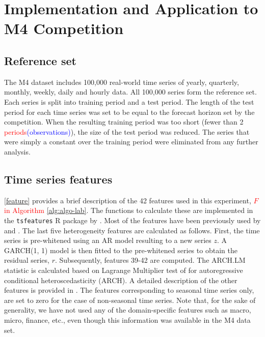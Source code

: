\documentclass[11pt,a4paper,]{article}
\theoremstyle{definition}
\theoremstyle{definition}
\theoremstyle{definition}
\theoremstyle{remark}
\begin{document}
\clearpage

\section{Implementation and Application to M4
Competition}\label{M4application}

\subsection{Reference set}\label{reference-set}

The M4 dataset includes 100,000 real-world time series of yearly,
quarterly, monthly, weekly, daily and hourly data. All 100,000 series
form the reference set. Each series is split into training period and a
test period. The length of the test period for each time series was set
to be equal to the forecast horizon set by the competition. When the
resulting training period was too short (fewer than 2
\textcolor{red}{periods}\textcolor{blue}{(observations)}), the size of
the test period was reduced. The series that were simply a constant over
the training period were eliminated from any further analysis.

\subsection{Time series features}\label{time-series-features}

\autoref{feature} provides a brief description of the 42 features used
in this experiment, \textcolor{red}{$F$ in Algorithm}
\ref{alg:algo-lab}. The functions to calculate these are implemented in
the \texttt{tsfeatures} R package by \textcite{tsfeatures}. Most of the
features have been previously used by \textcite{hyndman2015large} and
\textcite{fforms}. The last five heterogeneity features are calculated
as follows. First, the time series is pre-whitened using an AR model
resulting to a new series \(z\). A GARCH(1, 1) model is then fitted to
the pre-whitened series to obtain the residual series, \(r\).
Subsequently, features 39-42 are computed. The ARCH.LM statistic is
calculated based on Lagrange Multiplier test of
\textcite{engle1982autoregressive} for autoregressive conditional
heteroscedasticity (ARCH). A detailed description of the other features
is provided in \textcite{fforms}. The features corresponding to seasonal
time series only, are set to zero for the case of non-seasonal time
series. Note that, for the sake of generality, we have not used any of
the domain-specific features such as macro, micro, finance, etc., even
though this information was available in the M4 data
set.
\end{document}
